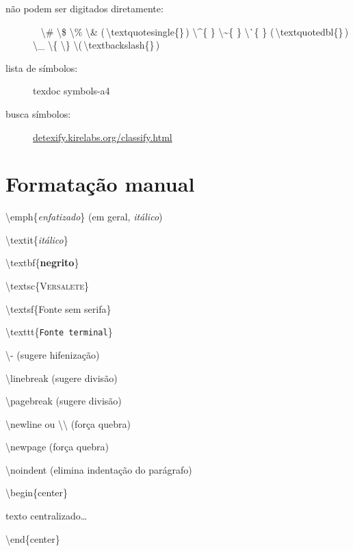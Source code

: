 \documentclass[11pt,twoside,english,brazil]{article}
\begin{document}
\begin{multicols}{3}
\begin{description}
  \item[não podem ser digitados diretamente:]~\vspace{2pt}\newline
    \null\quad\textbackslash{}\#
    \quad\textbackslash{}\$
    \quad\textbackslash{}\%
    \quad\textbackslash{}\&
    \quad\textquotesingle{}\enspace (\,\textbackslash{}textquotesingle\{\}\,)
    \vspace{2pt}\newline
    \null\quad\textbackslash{}\^{ }\{ \}
    \quad\textbackslash{}\~{ }\{ \}
    \quad\textbackslash{}\`{ }\{ \}
    \quad\textquotedbl{}\enspace (\,\textbackslash{}textquotedbl\{\}\,)
    \vspace{2pt}\newline
    \null\quad\textbackslash{}\_
    \quad\textbackslash{}\{
    \quad\textbackslash{}\}
    \quad\textbackslash{}\enspace (\,\textbackslash{}textbackslash\{\}\,)
\end{description}


\vspace{\baselineskip}


\begin{description}
  \item[lista de símbolos:] \textsf{texdoc symbols-a4}
  \item[busca símbolos:] \url{detexify.kirelabs.org/classify.html}
\end{description}

\section*{Formatação manual}

\textbackslash{}emph\{\emph{enfatizado}\} (em geral, \textit{itálico})

\textbackslash{}textit\{\textit{itálico}\}

\textbackslash{}textbf\{\textbf{negrito}\}

\textbackslash{}textsc\{\textsc{Versalete}\}

\textbackslash{}textsf\{\textsf{Fonte sem serifa}\}

\textbackslash{}texttt\{\texttt{Fonte terminal}\}

\textbackslash{}- (sugere hifenização)

\textbackslash{}linebreak (sugere divisão)

\textbackslash{}pagebreak (sugere divisão)

\textbackslash{}newline ou \textbackslash\textbackslash{} (força quebra)

\textbackslash{}newpage (força quebra)

\textbackslash{}noindent (elimina indentação do parágrafo)

\textbackslash{}begin\{center\}

\quad texto centralizado\dots

\textbackslash{}end\{center\}

\end{multicols}
\end{document}
